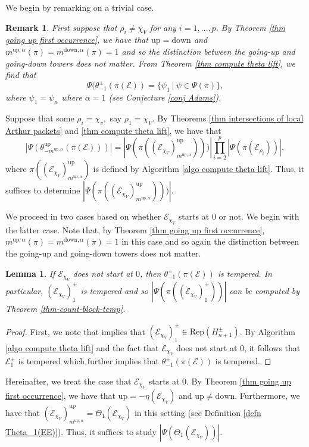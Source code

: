 \documentclass[11pt,letterpaper]{amsart}
\newcommand{\Rep}{{\mathrm{Rep}}}
\newcommand{\up}{{\mathrm{up}}}
\newcommand{\down}{{\mathrm{down}}}
\newcommand{\EE}{\mathcal{E}}
\newtheorem{lemma}[thm]{Lemma}
\newtheorem{rmk}[thm]{Remark}
\numberwithin{equation}{section}
\begin{document}
We begin by remarking on a trivial case.
\begin{rmk}\label{rmk theta lift when no chi_v}
First suppose that $\rho_i\neq\chi_V$ for any $i=1,\dots,p.$ By Theorem \ref{thm going up first occurrence}, we have that $\up=\down$ and $m^{\up, \alpha}(\pi)=m^{\down, \alpha}(\pi)=1$ and so the distinction between the going-up and going-down towers does not matter. From Theorem \ref{thm compute theta lift}, we find that
\[
\Psi(\theta_{-1}^{\pm}(\pi(\mathcal{E}))=\{\psi_1 \ | \ \psi\in\Psi(\pi)\},
\]
where $\psi_1=\psi_\alpha$ where $\alpha=1$ (see Conjecture \ref{conj Adams}).     
\end{rmk}

Suppose that some $\rho_i=\chi_v,$ say $\rho_1=\chi_V.$ By Theorems \ref{thm intersections of local Arthur packets} and \ref{thm compute theta lift}, we have that
\[
|\Psi(\theta_{-m^{\up, \alpha}}^\up(\pi(\mathcal{E})))|=|\Psi(\pi((\EE_{\chi_V})_{m^{\up, \alpha}}^\up)))|\prod_{i=2}^p|\Psi(\pi(\EE_{\rho_i}))|,
    \]
where $\pi((\EE_{\chi_V})_{m^{\up, \alpha}}^\up)$ is defined by Algorithm \ref{algo compute theta lift}. Thus, it suffices to determine $|\Psi(\pi((\EE_{\chi_V})_{m^{\up, \alpha}}^\up)))|.$


We proceed in two cases based on whether $\EE_{\chi_V}$ starts at 0 or not. We begin with the latter case. Note that, by Theorem \ref{thm going up first occurrence}, $m^{\up,\alpha}(\pi)=m^{\down,\alpha}(\pi)=1$ in this case and so again the distinction between the going-up and going-down towers does not matter.

\begin{lemma}\label{lemma-EE-does-not-start-at-zero}
    If $\EE_{\chi_V}$ does not start at $0$, then $\theta_{-1}^\pm(\pi(\mathcal{E}))$ is tempered. In particular,  
     $(\EE_{\chi_V})_1^\pm$ is tempered and so $|\Psi(\pi((\EE_{\chi_V})_1^\pm))|$ can be computed by Theorem \ref{thm-count-block-temp}.
\end{lemma}

\begin{proof}
    First, we note that \cite[Theorem B]{BH22} implies that $(\EE_{\chi_V})_1^\pm\in\Rep(H_{n+1}^\pm).$ By Algorithm \ref{algo compute theta lift} and the fact that $\EE_{\chi_V}$ does not start at 0, it follows that $\EE_1^\pm$ is tempered which further implies that $\theta_{-1}^\pm(\pi(\mathcal{E}))$ is tempered.
\end{proof}

Hereinafter, we treat the case that $\EE_{\chi_V}$ starts at 0. By Theorem \ref{thm going up first occurrence}, we have that $\up=-\eta(\EE_{\chi_V})$ and $\up\neq\down.$ Furthermore, we have that $(\EE_{\chi_V})_{m^{\up, \alpha}}^\up=\Theta_1(\EE_{\chi_V})$ in this setting (see Definition \ref{defn Theta_1(EE)}). Thus, it suffices to study $|\Psi(\Theta_1(\EE_{\chi_V}))|.$
\end{document}
